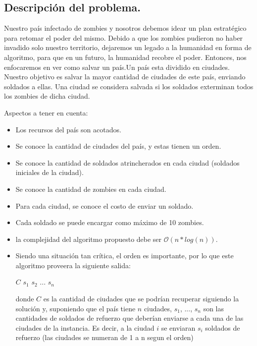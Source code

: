 \subsection{Descripción del problema.}

\vspace*{0.3cm}

Nuestro país infectado de zombies y nosotros debemos idear un plan estratégico para retomar el poder del mismo. Debido a que los zombies pudieron no haber invadido solo nuestro territorio, dejaremos un legado a la humanidad en forma de algoritmo, para que en un futuro, la humanidad recobre el poder.
Entonces, nos enfocaremos en ver como salvar un país.Un país esta dividido en ciudades. Nuestro objetivo es salvar la mayor cantidad de ciudades de este país, enviando soldados a ellas. Una ciudad se considera salvada si los soldados exterminan todos los zombies de dicha ciudad.

Aspectos a tener en cuenta:

\begin{itemize}
   \item Los recursos del país son acotados.
   \item Se conoce la cantidad de ciudades del país, y estas tienen un orden.
   \item Se conoce la cantidad de soldados atrincherados en cada ciudad (soldados iniciales de la ciudad).
   \item Se conoce la cantidad de zombies en cada ciudad.
   \item Para cada ciudad, se conoce el costo de enviar un soldado.
   \item Cada soldado se puede encargar como máximo de 10 zombies.
   \item la complejidad del algoritmo propuesto debe ser $\mathcal{O}(n*log(n))$.
	\item Siendo una situación tan crítica, el orden es importante, por lo que este algoritmo proveera la siguiente salida:

$C$ $s_{1}$ $s_{2}$ ... $s_{n}$

donde $C$ es la cantidad de ciudades que se podrían recuperar siguiendo la solución y, suponiendo que el país tiene $n$ ciudades, $s_{1}$, ..., $s_{n}$ son las cantidades de soldados de refuerzo que deberían enviarse a cada una de las ciudades de la instancia. Es decir, a la ciudad $i$ se enviaran $s_{i}$ soldados de refuerzo (las ciudades se numeran de 1 a n segun el orden)
\end{itemize}

